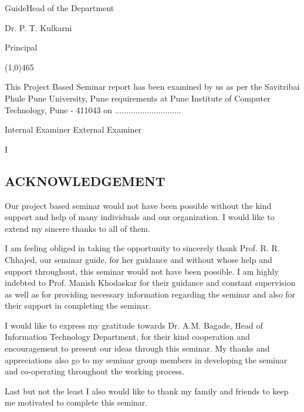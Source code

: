 ﻿\documentclass[a4paper, 12pt]{article}
\begin{document}
\begin{titlepage}
\hspace{20pt}Guide\hspace{220pt}Head of the Department

\begin{center}\textcolor[HTML]{FF0000}{Dr.  P. T. Kulkarni}\end{center}
\begin{center}
Principal
\end{center}
\begin{center}
\line(1,0){465}
\end{center}
{\large This Project Based Seminar report has been examined by us as per the
Savitribai Phule Pune University, Pune requirements at \textcolor[HTML]{FF0000}{Pune Institute of Computer Technology, Pune - 411043} on ............................. }
\linebreak
\linebreak
\linebreak
\linebreak
\linebreak
\linebreak
{\raggedright
{\large Internal Examiner \hspace{170pt}External Examiner}
}
\end{titlepage} 
\newpage
{}
\begin{center}
    I
\end{center}
\begin{center}
    \section*{ACKNOWLEDGEMENT}
\end{center}
\hspace{0.5cm}Our project based seminar would not have been possible without the kind support and help of many individuals and our organization. I would like to extend my sincere thanks to all of them.
\vspace{0.25cm}
\par I am feeling obliged in taking the opportunity to sincerely thank Prof. R. R. Chhajed, our seminar guide, for her guidance and without whose help and support throughout, this seminar would not have been possible. I am highly indebted to Prof. Manish Khodaskar for their guidance and constant supervision as well as for providing necessary information regarding the seminar and also for their support in completing the seminar.
\vspace{0.25cm}
\par I would like to express my gratitude towards Dr. A.M. Bagade, Head of Information Technology Department, for their kind cooperation and encouragement to present our ideas through this seminar. My thanks and appreciations also go to my seminar group members in developing the seminar and co-operating throughout the working process.
\vspace{0.25cm}
\par Last but not the least I also would like to thank my family and friends to keep me motivated to complete this seminar.
\end{document}

